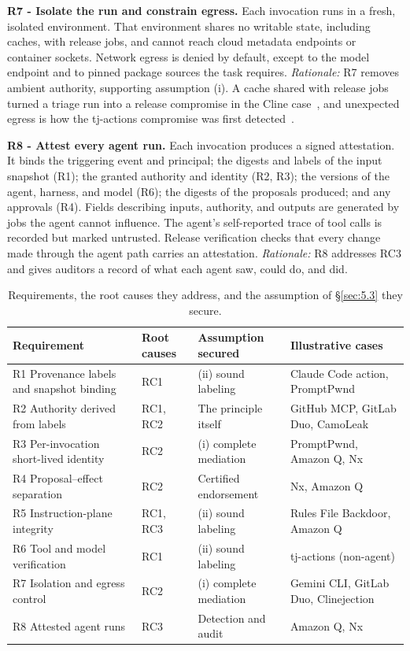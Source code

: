\documentclass[acmsmall,screen,review]{acmart}
\begin{document}
\textbf{R7 - Isolate the run and constrain egress.} Each invocation runs in a fresh, isolated environment. That environment shares no writable state, including caches, with release jobs, and cannot reach cloud metadata endpoints or container sockets. Network egress is denied by default, except to the model endpoint and to pinned package sources the task requires. \emph{Rationale:} R7 removes ambient authority, supporting assumption (i). A cache shared with release jobs turned a triage run into a release compromise in the Cline case~\cite{khan2026clinejection}, and unexpected egress is how the tj-actions compromise was first detected~\cite{stepsecurity2025harden}.

\textbf{R8 - Attest every agent run.} Each invocation produces a signed attestation. It binds the triggering event and principal; the digests and labels of the input snapshot (R1); the granted authority and identity (R2, R3); the versions of the agent, harness, and model (R6); the digests of the proposals produced; and any approvals (R4). Fields describing inputs, authority, and outputs are generated by jobs the agent cannot influence. The agent's self-reported trace of tool calls is recorded but marked untrusted. Release verification checks that every change made through the agent path carries an attestation. \emph{Rationale:} R8 addresses RC3 and gives auditors a record of what each agent saw, could do, and did.

\begin{table}[htbp]
\caption{Requirements, the root causes they address, and the assumption of \S\ref{sec:5.3} they secure.}
\label{tab:2}
\footnotesize
\begin{tabularx}{\linewidth}{@{}>{\hsize=1.491\hsize\raggedright\arraybackslash}X>{\hsize=0.400\hsize\raggedright\arraybackslash}X>{\hsize=0.949\hsize\raggedright\arraybackslash}X>{\hsize=1.161\hsize\raggedright\arraybackslash}X@{}}
\toprule
\textbf{Requirement} & \textbf{Root causes} & \textbf{Assumption secured} & \textbf{Illustrative cases} \\
\midrule
R1 Provenance labels and snapshot binding & RC1 & (ii) sound labeling & Claude Code action, PromptPwnd \\
R2 Authority derived from labels & RC1, RC2 & The principle itself & GitHub MCP, GitLab Duo, CamoLeak \\
R3 Per-invocation short-lived identity & RC2 & (i) complete mediation & PromptPwnd, Amazon Q, Nx \\
R4 Proposal–effect separation & RC2 & Certified endorsement & Nx, Amazon Q \\
R5 Instruction-plane integrity & RC1, RC3 & (ii) sound labeling & Rules File Backdoor, Amazon Q \\
R6 Tool and model verification & RC1 & (ii) sound labeling & tj-actions (non-agent) \\
R7 Isolation and egress control & RC2 & (i) complete mediation & Gemini CLI, GitLab Duo, Clinejection \\
R8 Attested agent runs & RC3 & Detection and audit & Amazon Q, Nx \\
\bottomrule
\end{tabularx}
\end{table}
\end{document}
